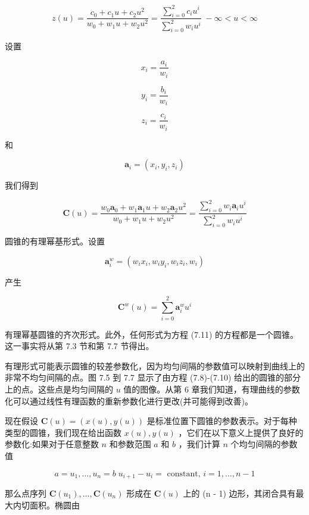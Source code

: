 \documentclass[../main.tex]{subfiles}
\begin{document}
\[
z\left( u\right)  = \frac{{c}_{0} + {c}_{1}u + {c}_{2}{u}^{2}}{{w}_{0} + {w}_{1}u + {w}_{2}{u}^{2}} = \frac{\mathop{\sum }\limits_{{i = 0}}^{2}{c}_{i}{u}^{i}}{\mathop{\sum }\limits_{{i = 0}}^{2}{w}_{i}{u}^{i}}\; - \infty  < u < \infty  \tag{7.11}
\]



设置

\[
{x}_{i} = \frac{{a}_{i}}{{w}_{i}}
\]

\[
{y}_{i} = \frac{{b}_{i}}{{w}_{i}}
\]

\[
{z}_{i} = \frac{{c}_{i}}{{w}_{i}}
\]

和

\[
{\mathbf{a}}_{i} = \left( {{x}_{i},{y}_{i},{z}_{i}}\right)
\]

我们得到

\[
\mathbf{C}\left( u\right)  = \frac{{w}_{0}{\mathbf{a}}_{0} + {w}_{1}{\mathbf{a}}_{1}u + {w}_{2}{\mathbf{a}}_{2}{u}^{2}}{{w}_{0} + {w}_{1}u + {w}_{2}{u}^{2}} = \frac{\mathop{\sum }\limits_{{i = 0}}^{2}{w}_{i}{\mathbf{a}}_{i}{u}^{i}}{\mathop{\sum }\limits_{{i = 0}}^{2}{w}_{i}{u}^{i}} \tag{7.12}
\]

圆锥的有理幂基形式。设置

\[
{\mathbf{a}}_{i}^{w} = \left( {{w}_{i}{x}_{i},{w}_{i}{y}_{i},{w}_{i}{z}_{i},{w}_{i}}\right)  \tag{7.13}
\]

产生

\[
{\mathbf{C}}^{w}\left( u\right)  = \mathop{\sum }\limits_{{i = 0}}^{2}{\mathbf{a}}_{i}^{w}{u}^{i} \tag{7.14}
\]

有理幂基圆锥的齐次形式。此外，任何形式为方程 (7.11) 的方程都是一个圆锥。这一事实将从第 7.3 节和第 7.7 节得出。

有理形式可能表示圆锥的较差参数化，因为均匀间隔的参数值可以映射到曲线上的非常不均匀间隔的点。图 7.5 到 7.7 显示了由方程 (7.8)-(7.10) 给出的圆锥的部分上的点。这些点是均匀间隔的 \(u\) 值的图像。从第 6 章我们知道，有理曲线的参数化可以通过线性有理函数的重新参数化进行更改(并可能得到改善)。

现在假设 \(\mathbf{C}\left( u\right)  = \left( {x\left( u\right) ,y\left( u\right) }\right)\) 是标准位置下圆锥的参数表示。对于每种类型的圆锥，我们现在给出函数 \(x\left( u\right) ,y\left( u\right)\) ，它们在以下意义上提供了良好的参数化:如果对于任意整数 \(n\) 和参数范围 \(a\) 和 \(b\) ，我们计算 \(n\) 个均匀间隔的参数值

\[
a = {u}_{1},\ldots ,{u}_{n} = b\;{u}_{i + 1} - {u}_{i} = \text{ constant, }i = 1,\ldots ,n - 1
\]

那么点序列 \(\mathbf{C}\left( {u}_{1}\right) ,\ldots ,\mathbf{C}\left( {u}_{n}\right)\) 形成在 \(\mathbf{C}\left( u\right)\) 上的 (n - 1) 边形，其闭合具有最大内切面积。椭圆由
\end{document}
